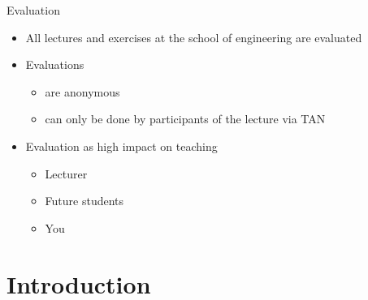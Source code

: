 \begin{frame}{Evaluation}
	\begin{itemize}
		\setlength\itemsep{0.3cm}
		\item All lectures and exercises at the school of engineering are evaluated
		\item Evaluations
		      \begin{itemize}
			      \item are anonymous
			      \item can only be done by participants of the lecture via TAN
		      \end{itemize}
		\item Evaluation as high impact on teaching
		      \begin{itemize}
			      \item Lecturer
			      \item Future students
			      \item You
		      \end{itemize}
	\end{itemize}
\end{frame}

\iffalse
\begin{frame}
	\frametitle{Important Password}
	\begin{tikzpicture}
		\matrix [matrix of nodes, draw=red!80!black, fill=red!40!white, rectangle, rounded corners,
			align=left, inner sep=5pt]
		(m) {
			Password: \texttt{\password}\\};
		\node [below= of m] (t) {For exercise registration in EST / StudOn};
		\draw [->] (m) -- (t);
	\end{tikzpicture}

	\begin{center}
		\alert{\url{https://www.studon.fau.de/studon/goto.php?target=frm_4286923}}
	\end{center}
\end{frame}
\fi

\section{Introduction}

